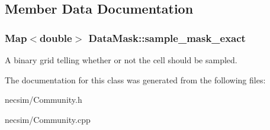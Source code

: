 \subsection{Member Data Documentation}
\subsubsection[{\texorpdfstring{sample\+\_\+mask\+\_\+exact}{sample_mask_exact}}]{\setlength{\rightskip}{0pt plus 5cm}Map$<$double$>$ Data\+Mask\+::sample\+\_\+mask\+\_\+exact\hspace{0.3cm}{\ttfamily [inherited]}}\hypertarget{class_data_mask_acc231ebddc3e5db0103220b20d968a4f}{}\label{class_data_mask_acc231ebddc3e5db0103220b20d968a4f}
A binary grid telling whether or not the cell should be sampled. 

The documentation for this class was generated from the following files\+:\begin{DoxyCompactItemize}
\item 
necsim/Community.\+h\item 
necsim/Community.\+cpp\end{DoxyCompactItemize}
